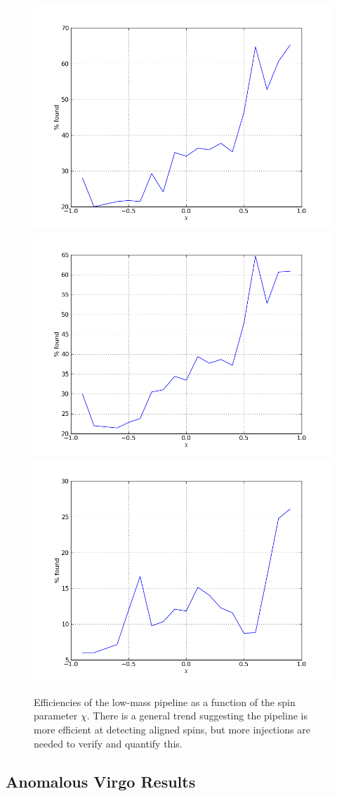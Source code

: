 \begin{figure}
  \includegraphics[width=0.5\linewidth]{figures/ninja2_results/H_second_spin_low_efficiency}
  \includegraphics[width=0.5\linewidth]{figures/ninja2_results/L_second_spin_low_efficiency} \\
  \includegraphics[width=0.5\linewidth]{figures/ninja2_results/V_second_spin_low_efficiency}
  \caption[Efficiency of the low-mass pipeline as a function of spin]{
  \label{f:low_spin_efficiencies}
Efficiencies of the low-mass pipeline as a function of the spin
parameter $\chi$.  There is a general trend suggesting the pipeline
is more efficient at detecting aligned spins, but more injections are
needed to verify and quantify this.
}
\end{figure}%


\subsection{Anomalous Virgo Results}
\label{ssec:virgo_anomaly}

